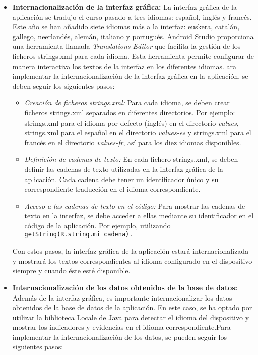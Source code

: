 \begin{itemize}
    \item \textbf{Internacionalización de la interfaz gráfica: }La interfaz
    gráfica de la aplicación se tradujo el curso pasado a tres idiomas: español,
    inglés y francés. Este año se han añadido siete idiomas más a la interfaz:
    euskera, catalán, gallego, neerlandés, alemán, italiano y portugués. Android
    Studio proporciona una herramienta llamada\textit{ Translations Editor} que
    facilita la gestión de los ficheros strings.xml para cada idioma. Esta
    herramienta permite configurar de manera interactiva los textos de la
    interfaz en los diferentes idiomas. ara implementar la internacionalización
    de la interfaz gráfica en la aplicación, se deben seguir los siguientes
    pasos:
    \begin{itemize}
        \item \textit{Creación de ficheros strings.xml:} Para cada idioma, se deben crear
        ficheros strings.xml separados en diferentes directorios. Por ejemplo:
        strings.xml para el idioma por defecto (inglés) en el directorio
        \textit{values}, strings.xml para el español en el directorio
        \textit{values-es} y strings.xml para el francés en el directorio \textit{values-fr}, así para los diez idiomas disponibles.
    
        \item \textit{Definición de cadenas de texto:} En cada fichero strings.xml, se
        deben definir las cadenas de texto utilizadas en la interfaz gráfica de
        la aplicación. Cada cadena debe tener un identificador único y su
        correspondiente traducción en el idioma correspondiente.
        
        \item \textit{Acceso a las cadenas de texto en el código:} Para mostrar las
        cadenas de texto en la interfaz, se debe acceder a ellas mediante su
        identificador en el código de la aplicación. Por ejemplo, utilizando
        \texttt{getString(R.string.mi\_cadena).}
    
        
        
    \end{itemize}
    Con estos pasos, la interfaz gráfica de la aplicación estará
    internacionalizada y mostrará los textos correspondientes al idioma
    configurado en el dispositivo siempre y cuando éste esté disponible.
    \item \textbf{Internacionalización de los datos obtenidos de la base de
    datos: }Además de la interfaz gráfica, es importante internacionalizar los
    datos obtenidos de la base de datos de la aplicación. En este caso, se ha
    optado por utilizar la biblioteca Locale de Java para detectar el idioma del
    dispositivo y mostrar los indicadores y evidencias en el idioma
    correspondiente.Para implementar la internacionalización de los datos, se
    pueden seguir los siguientes pasos:
    

\end{itemize}
